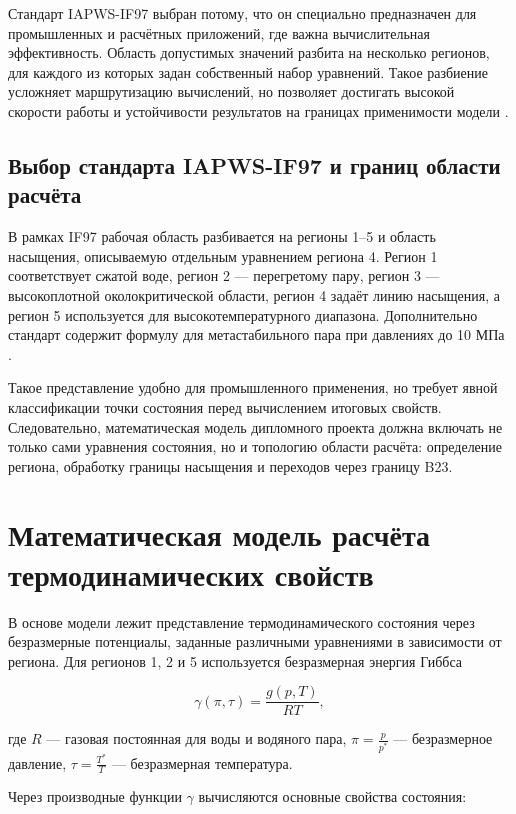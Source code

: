 Стандарт IAPWS-IF97 выбран потому, что он специально предназначен для
промышленных и расчётных приложений, где важна вычислительная эффективность.
Область допустимых значений разбита на несколько регионов, для каждого из
которых задан собственный набор уравнений.
Такое разбиение усложняет маршрутизацию вычислений, но позволяет достигать
высокой скорости работы и устойчивости результатов на границах применимости
модели \cite{iapws_if97_2012}.

\subsection{Выбор стандарта IAPWS-IF97 и границ области расчёта}

В рамках IF97 рабочая область разбивается на регионы 1--5 и область насыщения,
описываемую отдельным уравнением региона 4.
Регион 1 соответствует сжатой воде, регион 2 --- перегретому пару,
регион 3 --- высокоплотной околокритической области, регион 4 задаёт линию
насыщения, а регион 5 используется для высокотемпературного диапазона.
Дополнительно стандарт содержит формулу для метастабильного пара при давлениях
до 10 МПа \cite{iapws_if97_2012}.

Такое представление удобно для промышленного применения, но требует явной
классификации точки состояния перед вычислением итоговых свойств.
Следовательно, математическая модель дипломного проекта должна включать не
только сами уравнения состояния, но и топологию области расчёта: определение
региона, обработку границы насыщения и переходов через границу B23.

\section{Математическая модель расчёта термодинамических свойств}

В основе модели лежит представление термодинамического состояния через
безразмерные потенциалы, заданные различными уравнениями в зависимости от
региона.
Для регионов 1, 2 и 5 используется безразмерная энергия Гиббса
\cite{iapws_if97_2012}

\begin{equation}
\gamma(\pi,\tau) = \frac{g(p,T)}{RT},
\end{equation}

где $R$ --- газовая постоянная для воды и водяного пара,
$\pi = \frac{p}{p^{*}}$ --- безразмерное давление,
$\tau = \frac{T^{*}}{T}$ --- безразмерная температура.

Через производные функции $\gamma$ вычисляются основные свойства состояния:

